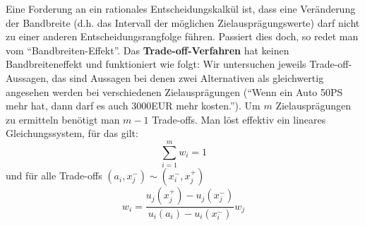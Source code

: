 Eine Forderung an ein rationales Entscheidungskalkül ist, dass eine Veränderung der Bandbreite (d.h. das Intervall der möglichen Zielausprägungswerte) darf nicht zu einer anderen Entscheidungsrangfolge führen. Passiert dies doch, so redet man vom ``Bandbreiten-Effekt''. Das \textbf{Trade-off-Verfahren} hat keinen Bandbreiteneffekt und funktioniert wie folgt: Wir untersuchen jeweils Trade-off-Aussagen, das sind Aussagen bei denen zwei Alternativen als gleichwertig angesehen werden bei verschiedenen Zielausprägungen (``Wenn ein Auto 50PS mehr hat, dann darf es auch 3000EUR mehr kosten.'').
Um \(m\) Zielausprägungen zu ermitteln benötigt man \(m-1\) Trade-offs. Man löst effektiv ein lineares Gleichungssystem, für das gilt:
\[
	\sum_{i=1}^m w_i = 1
\]
und für alle Trade-offs \((a_i, x_j^-) \sim (x_i^-, x_j^+)\)
\[
	w_i = \frac{u_j(x_j^+) - u_j(x_j^-)}{u_i(a_i) - u_i(x_i^-)} w_j
\]

